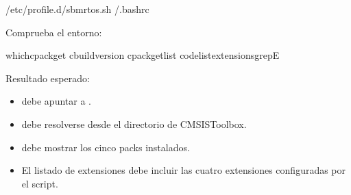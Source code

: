 \documentclass[letterpaper,10pt,english]{sphinxmanual}
\begin{document}
\begin{sphinxVerbatim}[commandchars=\\\{\}]
/etc/profile.d/sbm\PYGZhy{}rtos.sh
\PYGZti{}/.bashrc
\end{sphinxVerbatim}

\sphinxAtStartPar
Comprueba el entorno:

\begin{sphinxVerbatim}[commandchars=\\\{\}]
whichcpackget
cbuild\PYGZhy{}\PYGZhy{}version
cpackgetlist
code\PYGZhy{}\PYGZhy{}list\PYGZhy{}extensionsgrep\PYGZhy{}E
\end{sphinxVerbatim}

\sphinxAtStartPar
Resultado esperado:
\begin{itemize}
\item {} 
\sphinxAtStartPar
{} debe apuntar a .

\item {} 
\sphinxAtStartPar
{} debe resolverse desde el directorio de CMSIS\sphinxhyphen{}Toolbox.

\item {} 
\sphinxAtStartPar
{} debe mostrar los cinco packs instalados.

\item {} 
\sphinxAtStartPar
El listado de extensiones debe incluir las cuatro extensiones configuradas por
el script.

\end{itemize}
\end{document}
